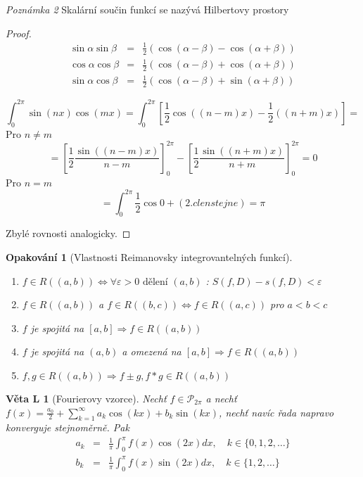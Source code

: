 \documentclass[11pt,a4paper]{article}
\newcounter{vety}
\newtheorem{vetal}[vety]{Věta L}
\newtheorem*{opakovani}{Opakování}
\begin{document}
\emph{Poznámka 2} Skalární součin funkcí se nazývá Hilbertovy prostory

\begin{proof}

\begin{eqnarray}
\sin \alpha \sin \beta & = & \frac{1}{2} \left( \cos (\alpha - \beta) - \cos (\alpha + \beta) \right) \nonumber\\
\cos \alpha \cos \beta & = & \frac{1}{2} \left( \cos (\alpha - \beta) + \cos (\alpha + \beta) \right) \nonumber\\
\sin \alpha \cos \beta & = & \frac{1}{2} \left( \cos (\alpha - \beta) + \sin (\alpha + \beta) \right) \nonumber
\end{eqnarray}

$$\int_{0}^{2 \pi} \sin (nx) \cos(mx) = \int_{0}^{2 \pi} \left[ \frac{1}{2} \cos \left( (n-m)x \right) - \frac{1}{2} \left( (n+m)x \right) \right] = $$
Pro $n \neq m$
$$= \left[ \frac{1}{2} \frac{\sin \left( (n-m)x \right)}{n-m} \right]_{0}^{2 \pi} - \left[ \frac{1}{2} \frac{\sin \left( (n+m)x \right)}{n+m} \right]_{0}^{2 \pi} = 0$$
Pro $n=m$
$$=\int_{0}^{2 \pi} \frac{1}{2} \cos 0 + (2. clen stejne) = \pi$$

Zbylé rovnosti analogicky.
\end{proof}\begin{opakovani}[Vlastnosti Reimanovsky integrovantelných funkcí] \quad
\begin{enumerate}
\item $f \in R((a,b)) \Leftrightarrow \forall \varepsilon > 0 \textrm{ dělení } (a,b)$ : $S(f,D) -s(f,D) < \varepsilon$
\item $f \in R((a,b))$ a $f \in R((b,c)) \Leftrightarrow f \in R((a,c))$ pro $a<b<c$
\item $f$ je spojitá na $[a,b] \Rightarrow f \in R((a,b))$
\item $f$ je spojitá na $(a,b)$ a omezená na $[a,b] \Rightarrow f \in R((a,b))$
\item $f, g \in R((a,b)) \Rightarrow f \pm g, f * g \in R((a,b))$
\end{enumerate}
\end{opakovani}

\begin{vetal}[Fourierovy vzorce]
Nechť $f \in \mathcal{P}_{2 \pi}$ a nechť $f(x) = \frac{a_0}{2} + \sum_{k=1}^{\infty} a_k \cos(kx) + b_k \sin(kx)$, nechť navíc řada napravo konverguje stejnoměrně. Pak
\begin{eqnarray}
a_k & = & \frac{1}{\pi} \int_0^\pi f(x) \cos(2x) dx, \quad k \in \{0, 1, 2, \ldots\} \nonumber\\
b_k & = & \frac{1}{\pi} \int_0^\pi f(x) \sin(2x) dx, \quad k \in \{1, 2, \ldots\} \nonumber
\end{eqnarray}
\end{vetal}
\end{document}
